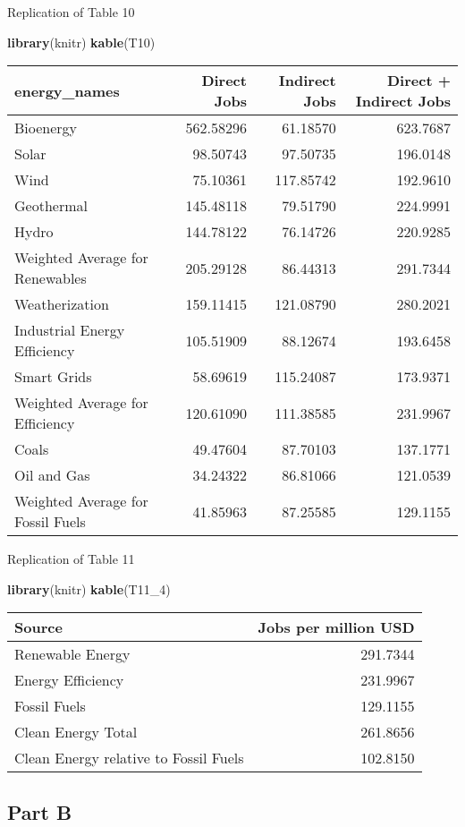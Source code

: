 \documentclass[
]{article}
\newenvironment{Shaded}{\begin{snugshade}}{\end{snugshade}}
\newcommand{\DecValTok}[1]{\textcolor[rgb]{0.00,0.00,0.81}{#1}}
\newcommand{\KeywordTok}[1]{\textcolor[rgb]{0.13,0.29,0.53}{\textbf{#1}}}
\newcommand{\NormalTok}[1]{#1}
\begin{document}
Replication of Table 10

\begin{Shaded}
\begin{Highlighting}[]
\KeywordTok{library}\NormalTok{(knitr)}
\KeywordTok{kable}\NormalTok{(T10)}
\end{Highlighting}
\end{Shaded}

\begin{longtable}[]{@{}lrrr@{}}
\toprule
energy\_names & Direct Jobs & Indirect Jobs & Direct + Indirect
Jobs\tabularnewline
\midrule
\endhead
Bioenergy & 562.58296 & 61.18570 & 623.7687\tabularnewline
Solar & 98.50743 & 97.50735 & 196.0148\tabularnewline
Wind & 75.10361 & 117.85742 & 192.9610\tabularnewline
Geothermal & 145.48118 & 79.51790 & 224.9991\tabularnewline
Hydro & 144.78122 & 76.14726 & 220.9285\tabularnewline
Weighted Average for Renewables & 205.29128 & 86.44313 &
291.7344\tabularnewline
Weatherization & 159.11415 & 121.08790 & 280.2021\tabularnewline
Industrial Energy Efficiency & 105.51909 & 88.12674 &
193.6458\tabularnewline
Smart Grids & 58.69619 & 115.24087 & 173.9371\tabularnewline
Weighted Average for Efficiency & 120.61090 & 111.38585 &
231.9967\tabularnewline
Coals & 49.47604 & 87.70103 & 137.1771\tabularnewline
Oil and Gas & 34.24322 & 86.81066 & 121.0539\tabularnewline
Weighted Average for Fossil Fuels & 41.85963 & 87.25585 &
129.1155\tabularnewline
\bottomrule
\end{longtable}

Replication of Table 11

\begin{Shaded}
\begin{Highlighting}[]
\KeywordTok{library}\NormalTok{(knitr)}
\KeywordTok{kable}\NormalTok{(T11_}\DecValTok{4}\NormalTok{)}
\end{Highlighting}
\end{Shaded}

\begin{longtable}[]{@{}lr@{}}
\toprule
Source & Jobs per million USD\tabularnewline
\midrule
\endhead
Renewable Energy & 291.7344\tabularnewline
Energy Efficiency & 231.9967\tabularnewline
Fossil Fuels & 129.1155\tabularnewline
Clean Energy Total & 261.8656\tabularnewline
Clean Energy relative to Fossil Fuels & 102.8150\tabularnewline
\bottomrule
\end{longtable}

\hypertarget{part-b}{%
\subsection{Part B}\label{part-b}}
\end{document}
